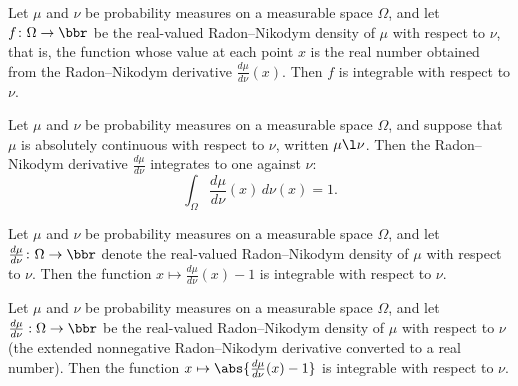 \begin{theorem}
\label{CommunicationComplexity.integrable_rnDensity}
\leanok
{}
Let $\mu$ and $\nu$ be probability measures on a measurable space $\Omega$, and let
$f\colon \Omega \to \bbr$ be the real-valued Radon–Nikodym density of $\mu$ with respect
to $\nu$, that is, the function whose value at each point $x$ is the real number
obtained from the Radon–Nikodym derivative $\frac{d\mu}{d\nu}(x)$. Then $f$ is
integrable with respect to $\nu$.
\end{theorem}

\begin{theorem}
\label{CommunicationComplexity.integral_rnDensity_eq_one_of_ac}
\leanok
{}
Let $\mu$ and $\nu$ be probability measures on a measurable space $\Omega$, and suppose
that $\mu$ is absolutely continuous with respect to $\nu$, written $\mu \l \nu$. Then
the Radon–Nikodym derivative $\frac{d\mu}{d\nu}$ integrates to one against $\nu$:
\[
  \int_{\Omega} \frac{d\mu}{d\nu}(x)\,d\nu(x) = 1.
\]
\end{theorem}

\begin{theorem}
\label{CommunicationComplexity.integrable_rnDensity_sub_one}
\leanok
{}
Let $\mu$ and $\nu$ be probability measures on a measurable space $\Omega$, and let
$\frac{d\mu}{d\nu}\colon \Omega \to \bbr$ denote the real-valued Radon–Nikodym density
of $\mu$ with respect to $\nu$. Then the function $x \mapsto \frac{d\mu}{d\nu}(x) - 1$
is integrable with respect to $\nu$.
\end{theorem}

\begin{theorem}
\label{CommunicationComplexity.integrable_abs_rnDensity_sub_one}
\leanok
{}
Let $\mu$ and $\nu$ be probability measures on a measurable space $\Omega$, and let
$\frac{d\mu}{d\nu} : \Omega \to \bbr$ be the real-valued Radon–Nikodym density of $\mu$
with respect to $\nu$ (the extended nonnegative Radon–Nikodym derivative converted to a
real number). Then the function $x \mapsto \abs{\frac{d\mu}{d\nu}(x) - 1}$ is integrable
with respect to $\nu$.
\end{theorem}

